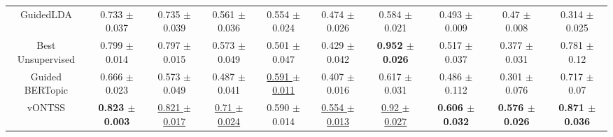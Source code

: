 \documentclass[11pt]{article}
\begin{document}
\begin{table*}
{\begin{tabular}{| c| c c c| c c c| c c c |}
\multicolumn{1}{c}{GuidedLDA} \vline & 0.733 $\pm$ 0.037 & 0.735 $\pm $0.039 & 0.561 $\pm$ 0.036 & 0.554 $\pm$ 0.024 & 0.474 $\pm$ 0.026 & 0.584 $\pm$ 0.021 & 0.493 $\pm$ 0.009 & 0.47 $\pm$ 0.008  & 0.314 $\pm$ 0.025\\

\multicolumn{1}{c}{Best Unsupervised} \vline & 0.799 $\pm$ 0.014 & 0.797 $\pm$ 0.015 & 0.573 $\pm $0.049  & 0.501 $\pm$ 0.047  & 0.429 $\pm$ 0.042 & \textbf{0.952 $\pm$ 0.026} & 0.517 $\pm$ 0.037   & 0.377 $\pm$ 0.031 & 0.781 $\pm$ 0.12\\

\multicolumn{1}{c}{Guided BERTopic} \vline & 0.666 $\pm$ 0.023  & 0.573 $\pm $0.049 & 0.487 $\pm$ 0.041   & \underline{0.591 $\pm$ 0.011}  & 0.407 $\pm$ 0.016 & 0.617 $\pm$ 0.031 & 0.486 $\pm$ 0.112   & 0.301 $\pm$ 0.076 & 0.717 $\pm$ 0.07\\

\hline
\multicolumn{1}{c}{vONTSS} \vline  & \textbf{0.823 $\pm$ 0.003} & \underline{0.821 $\pm$ 0.017} & \underline{0.71 $\pm$ 0.024}  & 0.590 $\pm$ 0.014 & \underline{0.554 $\pm$ 0.013} & \underline{0.92 $\pm$ 0.027} & \textbf{0.606 $\pm$ 0.032} & \textbf{0.576 $\pm$ 0.026} & \textbf{0.871 $\pm$ 0.036} \\
\hline

\end{tabular}}


\end{table*}
\end{document}
